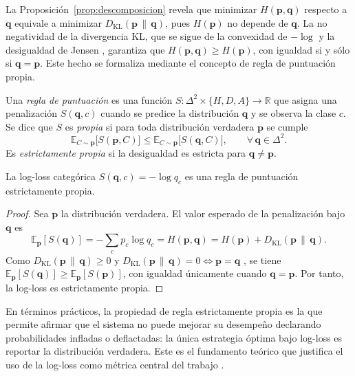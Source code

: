 La Proposici\'on~\ref{prop:descomposicion} revela que minimizar $H(\mathbf{p}, \mathbf{q})$ respecto a $\mathbf{q}$ equivale a minimizar $D_{\mathrm{KL}}(\mathbf{p} \,\|\, \mathbf{q})$, pues $H(\mathbf{p})$ no depende de $\mathbf{q}$. La no negatividad de la divergencia KL, que se sigue de la convexidad de $-\log$ y la desigualdad de Jensen \cite{cover2006}, garantiza que $H(\mathbf{p}, \mathbf{q}) \geq H(\mathbf{p})$, con igualdad si y s\'olo si $\mathbf{q} = \mathbf{p}$. Este hecho se formaliza mediante el concepto de regla de puntuaci\'on propia.

\begin{definition}
	Una \emph{regla de puntuaci\'on} es una funci\'on $S: \Delta^2 \times \{H,D,A\} \to \mathbb{R}$ que asigna una penalizaci\'on $S(\mathbf{q}, c)$ cuando se predice la distribuci\'on $\mathbf{q}$ y se observa la clase $c$. Se dice que $S$ es \emph{propia} si para toda distribuci\'on verdadera $\mathbf{p}$ se cumple
	\[
	\mathbb{E}_{C \sim \mathbf{p}}\bigl[S(\mathbf{p}, C)\bigr] \leq \mathbb{E}_{C \sim \mathbf{p}}\bigl[S(\mathbf{q}, C)\bigr], \qquad \forall\, \mathbf{q} \in \Delta^2.
	\]
	Es \emph{estrictamente propia} si la desigualdad es estricta para $\mathbf{q} \neq \mathbf{p}$.
\end{definition}

\begin{prop}\label{prop:proper}
	La log-loss categ\'orica $S(\mathbf{q}, c) = -\log q_c$ es una regla de puntuaci\'on estrictamente propia.
\end{prop}

\begin{proof}
	Sea $\mathbf{p}$ la distribuci\'on verdadera. El valor esperado de la penalizaci\'on bajo $\mathbf{q}$ es
	\[
	\mathbb{E}_{\mathbf{p}}[S(\mathbf{q})] = -\sum_c p_c \log q_c = H(\mathbf{p}, \mathbf{q}) = H(\mathbf{p}) + D_{\mathrm{KL}}(\mathbf{p} \,\|\, \mathbf{q}).
	\]
	Como $D_{\mathrm{KL}}(\mathbf{p} \,\|\, \mathbf{q}) \geq 0$ y $D_{\mathrm{KL}}(\mathbf{p} \,\|\, \mathbf{q}) = 0 \iff \mathbf{p} = \mathbf{q}$ \cite{cover2006}, se tiene $\mathbb{E}_{\mathbf{p}}[S(\mathbf{q})] \geq \mathbb{E}_{\mathbf{p}}[S(\mathbf{p})]$, con igualdad \'unicamente cuando $\mathbf{q} = \mathbf{p}$. Por tanto, la log-loss es estrictamente propia.
\end{proof}

En t\'erminos pr\'acticos, la propiedad de regla estrictamente propia es la que permite afirmar que el sistema no puede mejorar su desempe\~no declarando probabilidades infladas o deflactadas: la \'unica estrategia \'optima bajo log-loss es reportar la distribuci\'on verdadera. Este es el fundamento te\'orico que justifica el uso de la log-loss como m\'etrica central del trabajo \cite{gneiting2007}.

